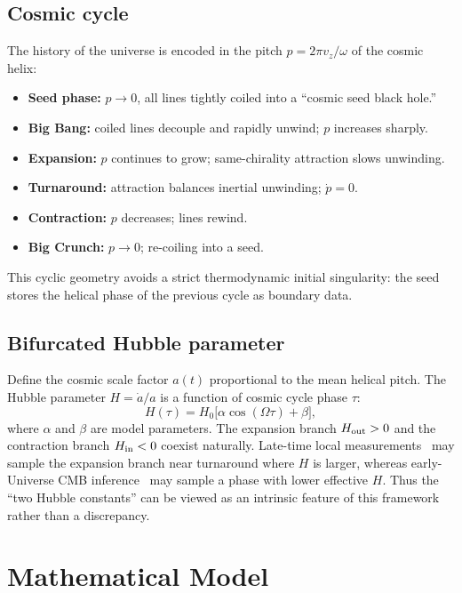 \documentclass[12pt,a4paper]{article}
\begin{document}
\subsection*{Cosmic cycle}

The history of the universe is encoded in the pitch $p=2\pi v_z/\omega$ of the cosmic helix:
\begin{itemize}
    \item \textbf{Seed phase:} $p\to 0$, all lines tightly coiled into a ``cosmic seed black hole.''
    \item \textbf{Big Bang:} coiled lines decouple and rapidly unwind; $p$ increases sharply.
    \item \textbf{Expansion:} $p$ continues to grow; same-chirality attraction slows unwinding.
    \item \textbf{Turnaround:} attraction balances inertial unwinding; $\dot p=0$.
    \item \textbf{Contraction:} $p$ decreases; lines rewind.
    \item \textbf{Big Crunch:} $p\to 0$; re-coiling into a seed.
\end{itemize}
This cyclic geometry avoids a strict thermodynamic initial singularity: the seed stores the helical phase of the previous cycle as boundary data.

\subsection*{Bifurcated Hubble parameter}

Define the cosmic scale factor $a(t)$ proportional to the mean helical pitch. The Hubble parameter $H=\dot a/a$ is a function of cosmic cycle phase $\tau$:
\begin{equation}
    H(\tau) = H_0\bigl[\alpha\cos(\Omega\tau)+\beta\bigr],
    \label{eq:Hubble}
\end{equation}
where $\alpha$ and $\beta$ are model parameters. The expansion branch $H_{\rm out}>0$ and the contraction branch $H_{\rm in}<0$ coexist naturally. Late-time local measurements~\cite{riess2016} may sample the expansion branch near turnaround where $H$ is larger, whereas early-Universe CMB inference~\cite{planck2020} may sample a phase with lower effective $H$. Thus the ``two Hubble constants'' can be viewed as an intrinsic feature of this framework rather than a discrepancy.

\section*{Mathematical Model}
\end{document}
